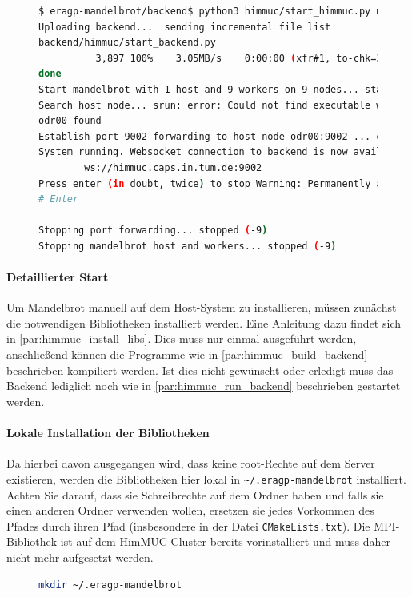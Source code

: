 \begin{figure}
	\begin{lstlisting}[language=bash, caption={Beispielausgabe bei Start der Entwicklungsumbegung auf dem HimMUC}, label={shell:start_himmuc_example}]
$ eragp-mandelbrot/backend$ python3 himmuc/start_himmuc.py muendler 10 9
Uploading backend...  sending incremental file list
backend/himmuc/start_backend.py
          3,897 100%    3.05MB/s    0:00:00 (xfr#1, to-chk=35/62)
done
Start mandelbrot with 1 host and 9 workers on 9 nodes... started mandelbrot
Search host node... srun: error: Could not find executable worker
odr00 found
Establish port 9002 forwarding to host node odr00:9002 ... established
System running. Websocket connection to backend is now available at
        ws://himmuc.caps.in.tum.de:9002
Press enter (in doubt, twice) to stop Warning: Permanently added the ED25519 host key for IP address '10.42.0.54' to the list of known hosts.
# Enter

Stopping port forwarding... stopped (-9)
Stopping mandelbrot host and workers... stopped (-9)
    \end{lstlisting}
\end{figure}

\paragraph{Detaillierter Start} \label{par:detailed_himmuc}

Um Mandelbrot manuell auf dem Host-System zu installieren,
müssen zunächst die notwendigen Bibliotheken installiert werden.
Eine Anleitung dazu findet sich in \autoref{par:himmuc_install_libs}.
Dies muss nur einmal ausgeführt werden, anschließend können die
Programme wie in \autoref{par:himmuc_build_backend} beschrieben kompiliert werden.
Ist dies nicht gewünscht oder erledigt muss das Backend lediglich noch wie
in \autoref{par:himmuc_run_backend} beschrieben gestartet werden.


\paragraph{Lokale Installation der Bibliotheken}\label{par:himmuc_install_libs}


Da hierbei davon ausgegangen wird, dass keine root-Rechte auf dem
Server existieren, werden die Bibliotheken hier lokal in \verb|~/.eragp-mandelbrot|
installiert.
Achten Sie darauf, dass sie Schreibrechte auf dem Ordner haben und
falls sie einen anderen Ordner verwenden wollen,
ersetzen sie jedes Vorkommen des Pfades durch ihren Pfad (insbesondere in der Datei \verb|CMakeLists.txt|).
Die MPI-Bibliothek ist auf dem HimMUC Cluster bereits vorinstalliert
und muss daher nicht mehr aufgesetzt werden.
\begin{figure}[h!]
	\begin{lstlisting}[language=bash, caption={Erstellen des Installationsordners}]
mkdir ~/.eragp-mandelbrot
    \end{lstlisting}
\end{figure}

